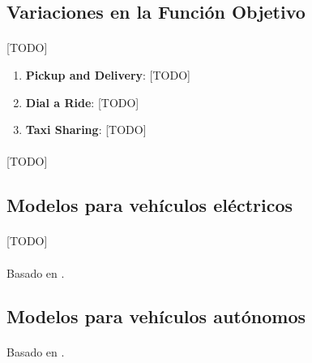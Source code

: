 \documentclass{subfiles}
\begin{document}
      \subsection{Variaciones en la Función Objetivo}
      \label{sec:formulation_extensions_objective_functions}

        \paragraph{}
        [TODO]

        \begin{enumerate}

          \item \textbf{Pickup and Delivery}: [TODO]

          \item \textbf{Dial a Ride}: [TODO]

          \item \textbf{Taxi Sharing}: [TODO]

        \end{enumerate}

        \paragraph{}
        [TODO]

      \subsection{Modelos para vehículos eléctricos}
      \label{sec:formulation_extensions_electric}

        \paragraph{}
        [TODO]

        \paragraph{}
        Basado en \cite{erdougan2012green}.

      \subsection{Modelos para vehículos autónomos}
      \label{sec:formulation_extensions_autonomous}

        \paragraph{}
        Basado en \cite{dial1995autonomous,bongiovanni2019electric}.
\end{document}

